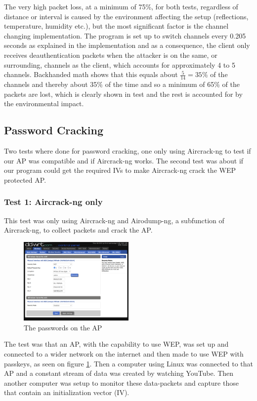 The very high packet loss, at a minimum of 75\%, for both tests, regardless of distance or interval is caused by the environment affecting the setup (reflections, temperature, humidity etc.), but the most significant factor is the channel changing implementation. The program is set up to switch channels every 0.205 seconds as explained in the implementation and as a consequence, the client only receives deauthentication packets when the attacker is on the same, or surrounding, channels as the client, which accounts for approximately 4 to 5 channels. Backhanded math shows that this equals about $\frac{5}{14} = 35\%$ of the channels and thereby about 35\% of the time and so a minimum of 65\% of the packets are lost, which is clearly shown in test and the rest is accounted for by the environmental impact.

\subsection{Password Cracking}
Two tests where done for password cracking, one only using Aircrack-ng to test if our AP was compatible and if Aircrack-ng works. The second test was about if our program could get the required IVs to make Aircrack-ng crack the WEP protected AP.

\subsubsection{Test 1: Aircrack-ng only}

This test was only using Aircrack-ng and Airodump-ng, a subfunction of Aircrack-ng, to collect packets and crack the AP.

\begin{figure}[!htbp]
    \centering
    \includegraphics[width=0.5\textwidth]{Latex-Files/Billeder/Kode2.png}
    \caption{The passwords on the AP}
    \label{Crack2}
\end{figure}

The test was that an AP, with the capability to use WEP, was set up and connected to a wider network on the internet and then made to use WEP with passkeys, as seen on figure \ref{Crack2}. Then a computer using Linux was connected to that AP and a constant stream of data was created by watching YouTube. Then another computer was setup to monitor these data-packets and capture those that contain an initialization vector (IV). 

